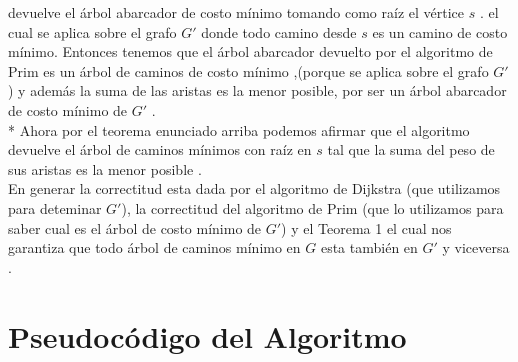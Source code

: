 \documentclass{article}
\begin{document}
    devuelve el \'arbol abarcador de costo m\'inimo tomando como ra\'iz el v\'ertice $s$ . el cual se aplica sobre el grafo $G'$ donde todo camino desde $s$ es un camino de  costo m\'inimo.
    Entonces tenemos que el \'arbol abarcador devuelto por el algoritmo de Prim es un \'arbol de caminos de costo m\'inimo ,(porque se aplica sobre el grafo $G'$ ) y adem\'as la suma de las aristas es la 
    menor posible, por ser un \'arbol abarcador de costo m\'inimo de $G'$ . 
    \\*
    Ahora por el teorema enunciado arriba podemos afirmar que el algoritmo devuelve el \'arbol de  caminos m\'inimos con ra\'iz en $s$ tal que la suma del peso de sus aristas es la menor posible . 
    \\
    En generar la correctitud esta dada por el algoritmo de Dijkstra (que utilizamos para deteminar $G'$), la correctitud del algoritmo de Prim (que lo utilizamos para saber cual es el \'arbol de costo m\'inimo de $G'$) y el Teorema 1 el cual nos 
    garantiza que todo \'arbol de caminos m\'inimo  en $G$ esta tambi\'en en $G'$ y viceversa . 

    \section{Pseudoc\'odigo del Algoritmo }
\end{document}
